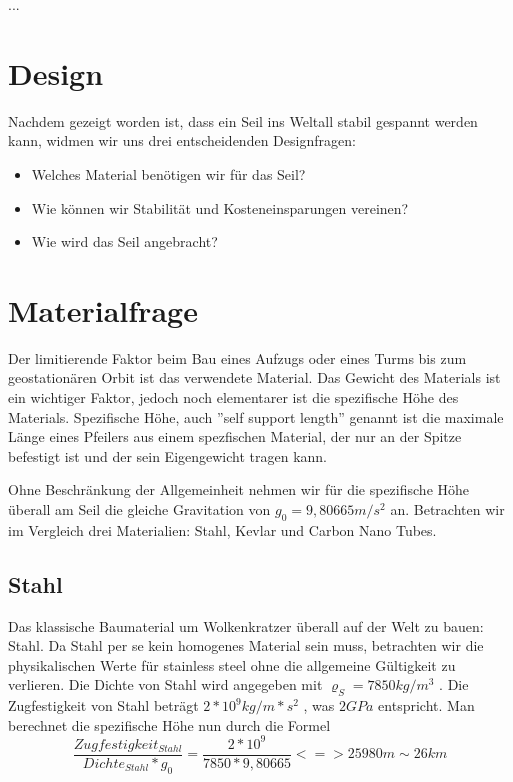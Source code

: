 \documentclass[a4paper, 10pt]{report}
\begin{document}
...
\section{Design}

Nachdem gezeigt worden ist, dass ein Seil ins Weltall stabil gespannt werden kann, widmen wir uns drei entscheidenden Designfragen: 
\begin{itemize}
\item Welches Material benötigen wir für das Seil?
\item Wie können wir Stabilität und Kosteneinsparungen vereinen?
\item Wie wird das Seil angebracht?
\end{itemize}

\section{Materialfrage}
Der limitierende Faktor beim Bau eines Aufzugs oder eines Turms bis zum geostationären Orbit ist das verwendete Material. Das Gewicht des Materials ist ein wichtiger Faktor, jedoch noch elementarer ist die spezifische Höhe des Materials. Spezifische Höhe, auch ''self support length'' genannt ist die maximale Länge eines Pfeilers aus einem spezfischen Material, der nur an der Spitze befestigt ist und der sein Eigengewicht tragen kann.\cite{wiki:Specific_strength}

Ohne Beschränkung der Allgemeinheit nehmen wir für die spezifische Höhe überall am Seil die gleiche Gravitation von $g_0 = 9,80665 m/s^2$ an.
Betrachten wir im Vergleich drei Materialien: Stahl, Kevlar und Carbon Nano Tubes. \cite[vergleiche]{ED00}
\subsection{Stahl}
Das klassische Baumaterial um Wolkenkratzer überall auf der Welt zu bauen: Stahl. Da Stahl per se kein homogenes Material sein muss, betrachten wir die physikalischen Werte für stainless steel ohne die allgemeine Gültigkeit zu verlieren. Die Dichte von Stahl wird angegeben mit $\varrho_S = 7850 kg/m^3$ \cite[Vgl.]{PE75}. Die Zugfestigkeit von Stahl beträgt $2*10^9 kg/m*s^2$ , was $2GPa$ entspricht. Man berechnet die spezifische Höhe nun durch die Formel 
\begin{equation}
\frac{Zugfestigkeit_{Stahl}}{Dichte_{Stahl}*g_0} = \frac{2*10^9}{7850*9,80665}
<=> 25 980 m \sim 26 km 
\end{equation}
\end{document}
